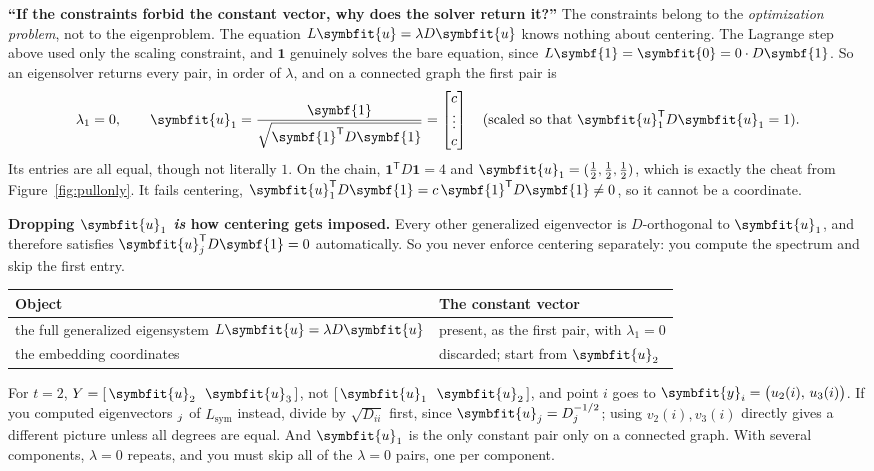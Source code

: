 \documentclass[11pt]{article}
\newcommand{\bm}[1]{\symbfit{#1}}
\let\vv\relax\newcommand{\vv}{\bm{v}}
\newcommand{\vu}{\bm{u}}
\newcommand{\one}{\symbf{1}}
\newcommand{\T}{^{\mathsf T}}
\begin{document}
\begin{careful}
\textbf{``If the constraints forbid the constant vector, why does the solver return it?''} The constraints belong to the \emph{optimization problem}, not to the eigenproblem. The equation $L\vu=\lambda D\vu$ knows nothing about centering. The Lagrange step above used only the scaling constraint, and $\one$ genuinely solves the bare equation, since $L\one=\bm0=0\cdot D\one$. So an eigensolver returns every pair, in order of $\lambda$, and on a connected graph the first pair is
\[
\lambda_1=0,\qquad \vu_1=\frac{\one}{\sqrt{\one\T D\one}}=\begin{bmatrix}c\\\vdots\\c\end{bmatrix}\quad(\text{scaled so that }\vu_1\T D\vu_1=1).
\]
Its entries are all equal, though not literally $1$. On the chain, $\one\T D\one=4$ and $\vu_1=(\tfrac12,\tfrac12,\tfrac12)$, which is exactly the cheat from Figure~\ref{fig:pullonly}. It fails centering, $\vu_1\T D\one=c\,\one\T D\one\ne0$, so it cannot be a coordinate.

\textbf{Dropping $\vu_1$ \emph{is} how centering gets imposed.} Every other generalized eigenvector is $D$-orthogonal to $\vu_1$, and therefore satisfies $\vu_j\T D\one=0$ automatically. So you never enforce centering separately: you compute the spectrum and skip the first entry.
\begin{center}
\small
\renewcommand{\arraystretch}{1.2}
\begin{tabular}{@{}ll@{}}
\toprule
Object & The constant vector\\
\midrule
the full generalized eigensystem $L\vu=\lambda D\vu$ & present, as the first pair, with $\lambda_1=0$\\
the embedding coordinates & discarded; start from $\vu_2$\\
\bottomrule
\end{tabular}
\end{center}
For $t=2$, $Y=[\,\vu_2\ \ \vu_3\,]$, not $[\,\vu_1\ \ \vu_2\,]$, and point $i$ goes to $\bm y_i=\big(u_2(i),\,u_3(i)\big)$. If you computed eigenvectors $\vv_j$ of $L_{\mathrm{sym}}$ instead, divide by $\sqrt{D_{ii}}$ first, since $\vu_j=D^{-1/2}\vv_j$; using $v_2(i),v_3(i)$ directly gives a different picture unless all degrees are equal. And $\vu_1$ is the only constant pair only on a connected graph. With several components, $\lambda=0$ repeats, and you must skip all of the $\lambda=0$ pairs, one per component.
\end{careful}
\end{document}
